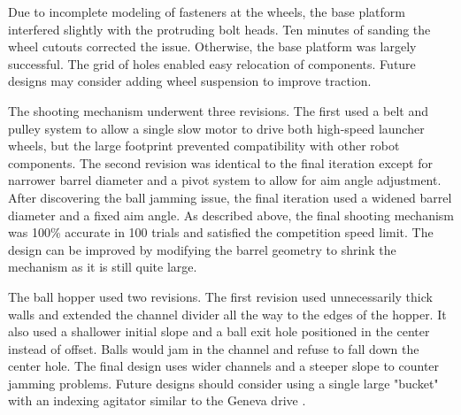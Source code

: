 Due to incomplete modeling of fasteners at the wheels, the base platform interfered slightly with the protruding bolt heads. Ten minutes of sanding the wheel cutouts corrected the issue. Otherwise, the base platform was largely successful. The grid of holes enabled easy relocation of components. Future designs may consider adding wheel suspension to improve traction.

The shooting mechanism underwent three revisions. The first used a belt and pulley system to allow a single slow motor to drive both high-speed launcher wheels, but the large footprint prevented compatibility with other robot components. The second revision was identical to the final iteration except for narrower barrel diameter and a pivot system to allow for aim angle adjustment. After discovering the ball jamming issue, the final iteration used a widened barrel diameter and a fixed aim angle. As described above, the final shooting mechanism was 100\% accurate in 100 trials and satisfied the competition speed limit. The design can be improved by modifying the barrel geometry to shrink the mechanism as it is still quite large.

The ball hopper used two revisions. The first revision used unnecessarily thick walls and extended the channel divider all the way to the edges of the hopper. It also used a shallower initial slope and a ball exit hole positioned in the center instead of offset. Balls would jam in the channel and refuse to fall down the center hole. The final design uses wider channels and a steeper slope to counter jamming problems. Future designs should consider using a single large "bucket" with an indexing agitator similar to the Geneva drive \cite{bickford_1972}.


